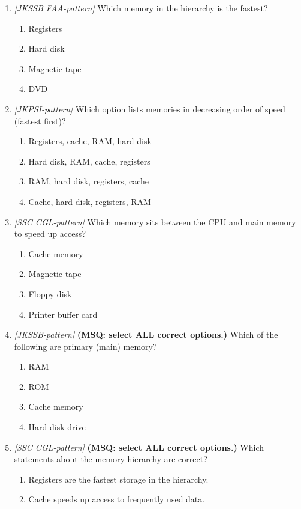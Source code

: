 \begin{enumerate}[label=\textbf{Q\arabic*.}, leftmargin=*]
\item \textit{[JKSSB FAA-pattern]} Which memory in the hierarchy is the fastest?
  \begin{enumerate}[label=\Alph*.]
    \item Registers
    \item Hard disk
    \item Magnetic tape
    \item DVD
  \end{enumerate}
\item \textit{[JKPSI-pattern]} Which option lists memories in decreasing order of speed (fastest first)?
  \begin{enumerate}[label=\Alph*.]
    \item Registers, cache, RAM, hard disk
    \item Hard disk, RAM, cache, registers
    \item RAM, hard disk, registers, cache
    \item Cache, hard disk, registers, RAM
  \end{enumerate}
\item \textit{[SSC CGL-pattern]} Which memory sits between the CPU and main memory to speed up access?
  \begin{enumerate}[label=\Alph*.]
    \item Cache memory
    \item Magnetic tape
    \item Floppy disk
    \item Printer buffer card
  \end{enumerate}
\item \textit{[JKSSB-pattern]} \textbf{(MSQ: select ALL correct options.)} Which of the following are primary (main) memory?
  \begin{enumerate}[label=\Alph*.]
    \item RAM
    \item ROM
    \item Cache memory
    \item Hard disk drive
  \end{enumerate}
\item \textit{[SSC CGL-pattern]} \textbf{(MSQ: select ALL correct options.)} Which statements about the memory hierarchy are correct?
  \begin{enumerate}[label=\Alph*.]
    \item Registers are the fastest storage in the hierarchy.
    \item Cache speeds up access to frequently used data.

\end{enumerate}
\end{enumerate}
